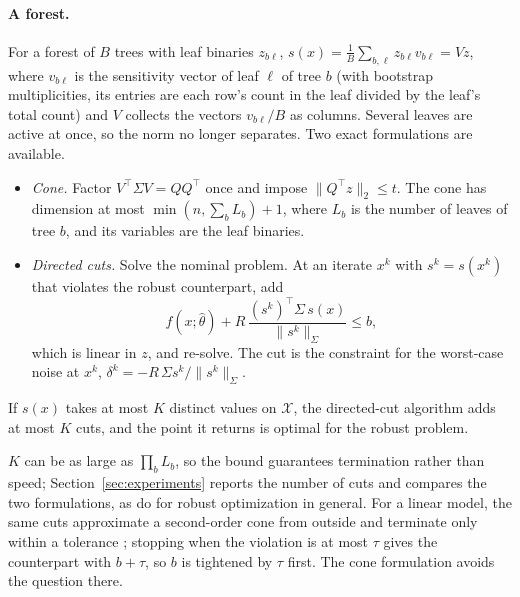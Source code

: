 \paragraph{A forest.}
For a forest of $B$ trees with leaf binaries $z_{b\ell}$,
$s(x) = \frac{1}{B}\sum_{b,\ell} z_{b\ell}v_{b\ell} = Vz$, where $v_{b\ell}$ is
the sensitivity vector of leaf $\ell$ of tree $b$ (with bootstrap
multiplicities, its entries are each row's count in the leaf divided by the
leaf's total count) and $V$ collects the vectors $v_{b\ell}/B$ as columns.
Several leaves are active at once, so the norm no longer separates. Two exact
formulations are available.
\begin{itemize}
  \item \emph{Cone.} Factor $V^\top\Sigma V = QQ^\top$ once and impose
    $\|Q^\top z\|_2 \le t$. The cone has dimension at most
    $\min(n, \sum_b L_b) + 1$, where $L_b$ is the number of leaves of tree $b$,
    and its variables are the leaf binaries.
  \item \emph{Directed cuts.} Solve the nominal problem. At an iterate $x^k$
    with $s^k = s(x^k)$ that violates the robust counterpart, add
    \begin{equation}\label{eq:cut}
      f(x;\hat\theta) + R\,\frac{(s^k)^\top\Sigma\,s(x)}{\|s^k\|_\Sigma}
      \le b ,
    \end{equation}
    which is linear in $z$, and re-solve. The cut is the constraint for the
    worst-case noise at $x^k$, $\delta^k = -R\,\Sigma s^k / \|s^k\|_\Sigma$.
\end{itemize}

\begin{proposition}\label{prop:cuts}
If $s(x)$ takes at most $K$ distinct values on $\mathcal{X}$, the directed-cut
algorithm adds at most $K$ cuts, and the point it returns is optimal for the
robust problem.
\end{proposition}

$K$ can be as large as $\prod_b L_b$, so the bound guarantees termination
rather than speed; Section~\ref{sec:experiments} reports the number of cuts
and compares the two formulations, as \citet{bertsimas2016reformulation} do
for robust optimization in general. For a linear model, the same cuts
approximate a second-order cone from outside and terminate only within a
tolerance \citep{mutapcic2009cutting}; stopping when the violation is at most
$\tau$ gives the counterpart with $b + \tau$, so $b$ is tightened by $\tau$
first. The cone formulation avoids the question there.

